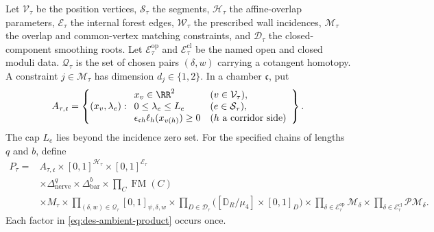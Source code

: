 \begin{definition}
Let $\mathcal V_\tau$ be the position vertices, $\mathcal S_\tau$ the
segments, $\mathcal H_\tau$ the affine-overlap parameters,
$\mathcal E_\tau$ the internal forest edges, $\mathcal W_\tau$ the prescribed
wall incidences, $\mathcal M_\tau$ the overlap and common-vertex matching
constraints, and $\mathcal D_\tau$ the closed-component smoothing roots.  Let
$\mathcal E_\tau^{\mathrm{op}}$ and
$\mathcal E_\tau^{\mathrm{cl}}$ be the named open and closed moduli data.
$\mathcal Q_\tau$ is the set of chosen pairs $(\delta,w)$ carrying a
cotangent homotopy.
A constraint $j\in\mathcal M_\tau$ has
dimension $d_j\in\{1,2\}$.  In a chamber $\mathfrak c$, put
\begin{equation}
 A_{\tau,\mathfrak c}=
 \left\{(x_v,\lambda_e):
 \begin{array}{ll}
 x_v\in\RR^2 &(v\in\mathcal V_\tau),\\
 0\leq\lambda_e\leq L_e &(e\in\mathcal S_\tau),\\
 \epsilon_{\mathfrak c h}\ell_h(x_{v(h)})\geq0
   &(h\text{ a corridor side})
 \end{array}\right\}.
 \label{eq:des-position-polytope}
\end{equation}
The cap $L_e$ lies beyond the incidence zero set.  For the specified chains
of lengths $q$ and $b$, define
\begin{equation}
\begin{aligned}
 P_\tau={}&A_{\tau,\mathfrak c}
 \times[0,1]^{\mathcal H_\tau}
 \times[0,1]^{\mathcal E_\tau}\\
 &\times\Delta^q_{\mathrm{nerve}}
 \times\Delta^b_{\mathrm{bar}}
 \times\prod_C\operatorname{FM}(C)\\
 &\times M_\tau
 \times\prod_{(\delta,w)\in\mathcal Q_\tau}[0,1]_{\psi,\delta,w}
 \times\prod_{D\in\mathcal D_\tau}
   \bigl([\mathbb D_R/\mu_4]\times[0,1]_D\bigr)
 \times\prod_{\delta\in\mathcal E_\tau^{\mathrm{op}}}
   \mathcal M_\delta
 \times\prod_{\delta\in\mathcal E_\tau^{\mathrm{cl}}}
   \mathcal{PM}_{\delta}.
\end{aligned}
 \label{eq:des-ambient-product}
\end{equation}
Each factor in
\eqref{eq:des-ambient-product} occurs once.


\end{definition}
